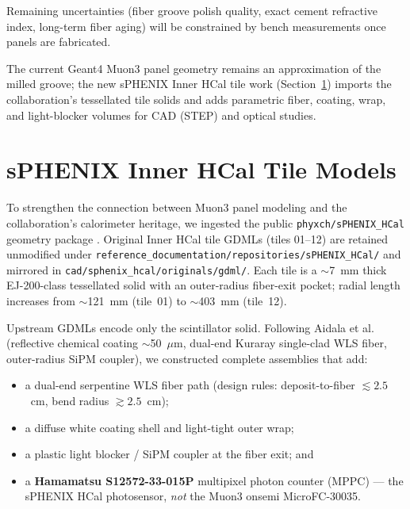 \documentclass[11pt,a4paper]{article}
\begin{document}
Remaining uncertainties (fiber groove polish quality, exact cement refractive index, long-term fiber aging) will be constrained by bench measurements once panels are fabricated.

The current Geant4 Muon3 panel geometry remains an approximation of the milled groove; the new sPHENIX Inner HCal tile work (Section~\ref{sec:hcal-tiles}) imports the collaboration's tessellated tile solids and adds parametric fiber, coating, wrap, and light-blocker volumes for CAD (STEP) and optical studies.

\section{sPHENIX Inner HCal Tile Models}
\label{sec:hcal-tiles}

To strengthen the connection between Muon3 panel modeling and the collaboration's calorimeter heritage, we ingested the public \texttt{phyxch/sPHENIX\_HCal} geometry package \cite{phyxch-sphenix-hcal}. Original Inner HCal tile GDMLs (tiles 01--12) are retained unmodified under \texttt{reference\_documentation/repositories/sPHENIX\_HCal/} and mirrored in \texttt{cad/sphenix\_hcal/originals/gdml/}. Each tile is a $\sim$7~mm thick EJ-200-class tessellated solid with an outer-radius fiber-exit pocket; radial length increases from $\sim$121~mm (tile~01) to $\sim$403~mm (tile~12).

Upstream GDMLs encode only the scintillator solid. Following Aidala et al.\ \cite{sphenix-hcal-tns} (reflective chemical coating $\sim$50~$\mu$m, dual-end Kuraray single-clad WLS fiber, outer-radius SiPM coupler), we constructed complete assemblies that add:
\begin{itemize}
  \item a dual-end serpentine WLS fiber path (design rules: deposit-to-fiber $\lesssim 2.5$~cm, bend radius $\gtrsim 2.5$~cm);
  \item a diffuse white coating shell and light-tight outer wrap;
  \item a plastic light blocker / SiPM coupler at the fiber exit; and
  \item a \textbf{Hamamatsu S12572-33-015P} multipixel photon counter (MPPC) --- the sPHENIX HCal photosensor, \emph{not} the Muon3 onsemi MicroFC-30035.
\end{itemize}
\end{document}

